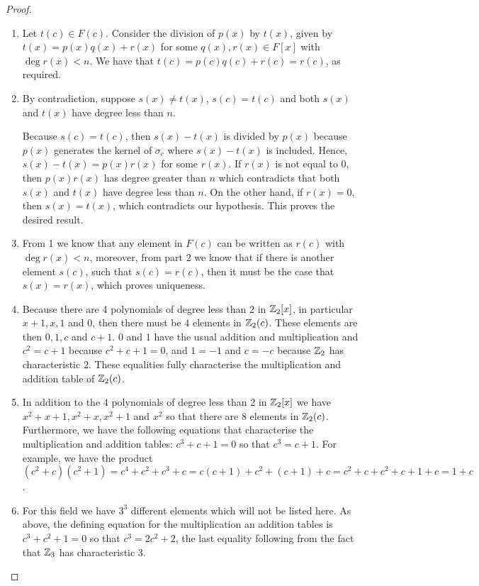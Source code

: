 \begin{proof}
 \begin{enumerate}
     \item Let $t(c)\in F(c)$. Consider the division of $p(x)$ by $t(x)$, given by $t(x)=p(x)q(x)+r(x)$ for some $q(x),r(x)\in F[x]$ with $\deg r(x)<n$. We have that $t(c)=p(c)q(c)+r(c)=r(c)$, as required.
     \item By contradiction, suppose $s(x)\neq t(x)$, $s(c)=t(c)$ and both $s(x)$ and $t(x)$ have degree less than $n$.

     Because $s(c)=t(c)$, then $s(x)-t(x)$ is divided by $p(x)$ because $p(x)$ generates the kernel of $\sigma_c$ where $s(x)-t(x)$ is included. Hence, $s(x)-t(x)=p(x)r(x)$ for some $r(x)$. If $r(x)$ is not equal to $0$, then $p(x)r(x)$ has degree greater than $n$ which contradicts that both $s(x)$ and $t(x)$ have degree less than $n$. On the other hand, if $r(x)=0$, then $s(x)=t(x)$, which contradicts our hypothesis. This proves the desired result.
     \item From 1 we know that any element in $F(c)$ can be written as $r(c)$ with $\deg r(x)< n$, moreover, from part 2 we know that if there is another element $s(c)$, such that $s(c)=r(c)$, then it must be the case that $s(x)=r(x)$, which proves uniqueness.
    \item Because there are $4$ polynomials of degree less than 2 in $\mathbb{Z}_2[x]$, in particular $x+1,x,1$ and $0$, then there must be $4$ elements in $\mathbb{Z}_2(c)$. These elements are then $0,1,c$ and $c+1$. $0$ and $1$ have the usual addition and multiplication and $c^2=c+1$ because $c^2+c+1=0$, and $1=-1$ and $c=-c$ because $\mathbb{Z}_2$ has characteristic $2$. These equalities fully characterise the multiplication and addition table of $\mathbb{Z}_2(c)$.
    \item In addition to the $4$ polynomials of degree less than 2 in $\mathbb{Z}_2[x]$ we have $x^2+x+1, x^2+x, x^2+1$ and $x^2$ so that there are $8$ elements in $\mathbb{Z}_2(c)$. Furthermore, we have the following equations that characterise the multiplication and addition tables: $c^3+c+1=0$ so that $c^3=c+1$. For example, we have the product $(c^2+c)(c^2+1)= c^4+c^2+c^3+c= c(c+1)+c^2+(c+1)+c= c^2+c+c^2+c+1+c= 1+c$.
    \item For this field we have $3^3$ different elements which will not be listed here. As above, the defining equation for the multiplication an addition tables is $c^3+c^2+1=0$ so that $c^3=2c^2+2$, the last equality following from the fact that $\mathbb{Z}_3$ has characteristic 3. 
 \end{enumerate}
\end{proof}

